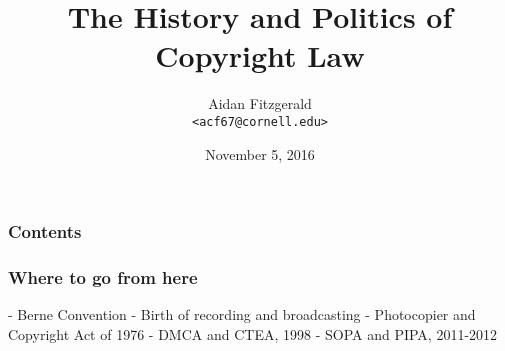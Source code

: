 \documentclass{beamer}
\title{The History and Politics of Copyright Law}
\author{
Aidan Fitzgerald \\
\texttt{<acf67@cornell.edu>}
}
\date{November 5, 2016}
\begin{document}

\begin{frame}
  \titlepage
\end{frame}



\begin{frame}
  \frametitle{Contents}
  \tableofcontents
\end{frame}





\begin{frame}
  \frametitle{Where to go from here}

  - Berne Convention
  - Birth of recording and broadcasting
  - Photocopier and Copyright Act of 1976
  - DMCA and CTEA, 1998
  - SOPA and PIPA, 2011-2012
\end{frame}
\end{document}
